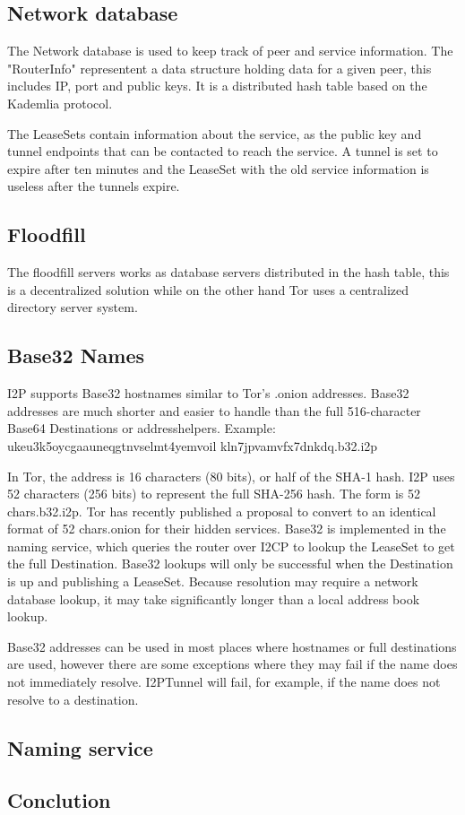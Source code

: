 \documentclass[a4paper,twocolumn,12pt]{article}
\begin{document}
\subsection{Network database}

The Network database is used to keep track of peer and service information. The "RouterInfo" representent a data structure holding data for a given peer, this includes IP, port and public keys. It is a distributed hash table based on the Kademlia protocol.

The LeaseSets contain information about the service, as the public key and tunnel endpoints that can be contacted to reach the service. A tunnel is set to expire after ten minutes and the LeaseSet with the old service information is useless after the tunnels expire. 

\subsection{Floodfill}

The floodfill servers works as database servers distributed in the hash table, this is a decentralized solution while on the other hand Tor uses a centralized directory server system.


\subsection{Base32 Names}

I2P supports Base32 hostnames similar to Tor's .onion addresses. Base32 addresses are much shorter and easier to handle than the full 516-character Base64 Destinations or addresshelpers. Example: 
ukeu3k5oycgaauneqgtnvselmt4yemvoil
kln7jpvamvfx7dnkdq.b32.i2p

In Tor, the address is 16 characters (80 bits), or half of the SHA-1 hash.
\cite{tor-hiddenservice}
I2P uses 52 characters (256 bits) to represent the full SHA-256 hash. The form is {52 chars}.b32.i2p. Tor has recently published a proposal to convert to an identical format of {52 chars}.onion for their hidden services. Base32 is implemented in the naming service, which queries the router over I2CP to lookup the LeaseSet to get the full Destination. Base32 lookups will only be successful when the Destination is up and publishing a LeaseSet. Because resolution may require a network database lookup, it may take significantly longer than a local address book lookup.

Base32 addresses can be used in most places where hostnames or full destinations are used, however there are some exceptions where they may fail if the name does not immediately resolve. I2PTunnel will fail, for example, if the name does not resolve to a destination.

\subsection{Naming service}


\subsection{Conclution}




\end{document}
